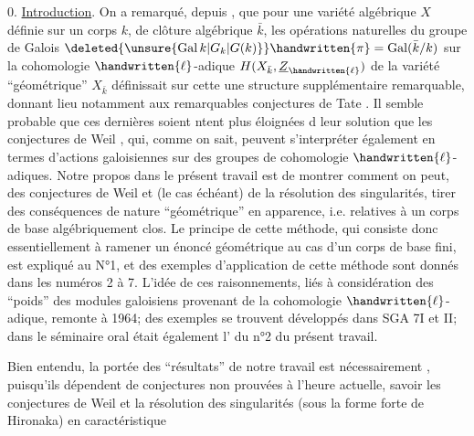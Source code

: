 0. \uline{Introduction}. On a remarqué, depuis , que pour une variété algébrique $X$ définie sur un corps $k$, de clôture algébrique $\bar{k}$, les opérations naturelles du groupe de Galois $\deleted{\unsure{\operatorname{Gal}k|G_k|G(k)}}\handwritten{\pi}=\operatorname{Gal}(\bar{k}/k)$ sur la cohomologie $\handwritten{\ell}$-adique $H(X_{\bar{k}},\underline{Z}_{\handwritten{\ell}})$ de la variété ``géométrique'' $X_{\bar{k}}$ définissait sur cette  une structure supplémentaire remarquable, donnant lieu notamment aux remarquables conjectures de Tate \handwritten{[\quad]}. Il semble probable que ces dernières soient ntent plus éloignées d leur solution que les conjectures de Weil \handwritten{[\quad,\quad]}, qui, comme on sait, peuvent s'interpréter également en termes d'actions galoisiennes sur des groupes de cohomologie $\handwritten{\ell}$-adiques. Notre propos dans le présent travail est de montrer comment on peut, des conjectures de Weil et (le cas échéant) de la résolution des singularités, tirer des conséquences de nature ``géométrique'' en apparence, i.e. relatives à un corps de base algébriquement clos. Le principe de cette méthode, qui consiste donc essentiellement à ramener un énoncé géométrique au cas d'un corps de base fini, est expliqué au N°1, et des exemples d'application de cette méthode sont donnés dans les numéros 2 à 7.  L'idée de ces raisonnements, liés à considération des ``poids'' des modules galoisiens provenant de la cohomologie $\handwritten{\ell}$-adique, remonte à 1964; des exemples  se trouvent développés dans SGA 7\handwritten{(}I et II\handwritten{)}; dans le séminaire oral était également l' du n°2 du présent travail.

Bien entendu, la portée des ``résultats'' de notre travail est nécessairement , puisqu'ils dépendent de conjectures non prouvées à l'heure actuelle, savoir les conjectures de Weil et la résolution des singularités (sous la forme forte de Hironaka) en caractéristique

